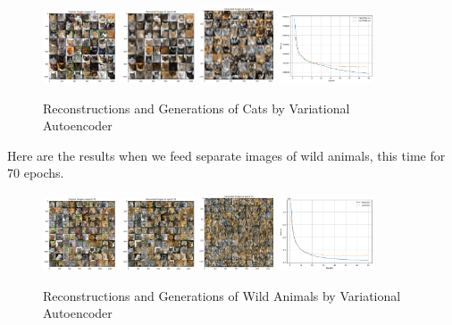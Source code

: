 \documentclass[10pt,a4paper]{article}
\begin{document}
\begin{figure}[h]
    \centering
    \includegraphics[width=0.4\textwidth]{catsReconstruct.png}
    \includegraphics[width=0.2\textwidth]{CatGeneration1.png}
    \includegraphics[width=0.25\textwidth]{catLoss.png}
    \caption{Reconstructions and Generations of Cats by Variational Autoencoder}
    \label{fig:my_label}
\end{figure} 

Here are the results when we feed separate images of wild animals, this time for 70 epochs.
\begin{figure}[h]
    \centering
    \includegraphics[width=0.4\textwidth]{wildanimal.png}
    \includegraphics[width=0.2\textwidth]{wildanimal1.png}
    \includegraphics[width=0.25\textwidth]{losscurve2.png}
    \caption{Reconstructions and Generations of Wild Animals by Variational Autoencoder}
    \label{fig:my_label}
\end{figure}
\end{document}
